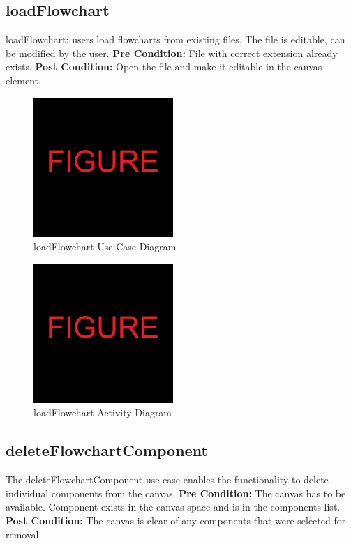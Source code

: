 \documentclass[11pt,a4paper,titlepage]{article}
\begin{document}
\newpage
\subsection{loadFlowchart}
loadFlowchart: users load flowcharts from existing files. The file is editable, can be modified by the user.\newline\newline
\textbf{Pre Condition:} File with correct extension already exists.\newline\newline
\textbf{Post Condition:} Open the file and make it editable in the canvas element.

\begin{figure}[H]
  \centering
\includegraphics[width=200px]{figure.jpg}
\caption{loadFlowchart Use Case Diagram}
\end{figure}

\begin{figure}[H]
  \centering
\includegraphics[width=200px]{figure.jpg}
\caption{loadFlowchart Activity Diagram}
\end{figure}

\newpage
\subsection{deleteFlowchartComponent}
The deleteFlowchartComponent use case enables the functionality to delete individual components from the canvas.\newline\newline
\textbf{Pre Condition:} The canvas has to be available. Component exists in the canvas space and is in the components list.\newline\newline
\textbf{Post Condition:} The canvas is clear of any components that were selected for removal.
\end{document}
